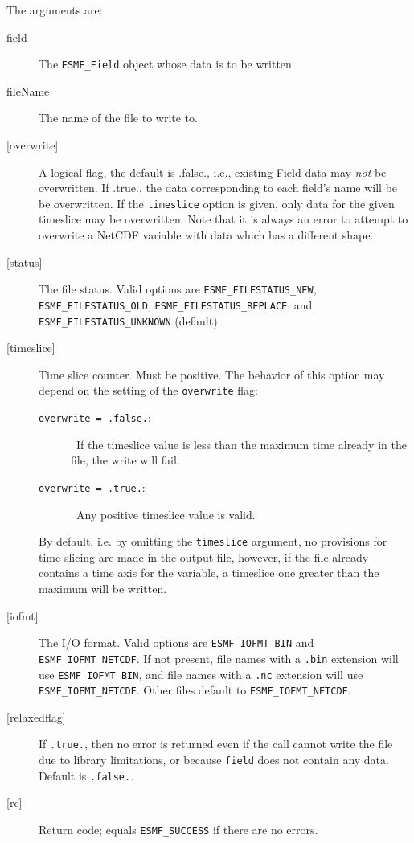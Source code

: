      The arguments are:
     \begin{description}
     \item[field]
       The {\tt ESMF\_Field} object whose data is to be written.
     \item[fileName]
       The name of the file to write to.
     \item[{[overwrite]}]
        A logical flag, the default is .false., i.e., existing Field data may
        {\em not} be overwritten. If .true., the
        data corresponding to each field's name will be
        be overwritten. If the {\tt timeslice} option is given, only data for
        the given timeslice may be overwritten.
        Note that it is always an error to attempt to overwrite a NetCDF
        variable with data which has a different shape.
     \item[{[status]}]
        The file status. Valid options are {\tt ESMF\_FILESTATUS\_NEW}, 
        {\tt ESMF\_FILESTATUS\_OLD}, {\tt ESMF\_FILESTATUS\_REPLACE}, and
        {\tt ESMF\_FILESTATUS\_UNKNOWN} (default).
     \item[{[timeslice]}]
       Time slice counter. Must be positive. The behavior of this
       option may depend on the setting of the {\tt overwrite} flag:
       \begin{description}
       \item[{\tt overwrite = .false.}:]\ If the timeslice value is
       less than the maximum time already in the file, the write will fail.
       \item[{\tt overwrite = .true.}:]\ Any positive timeslice value is valid.
       \end{description}
       By default, i.e. by omitting the {\tt timeslice} argument, no
       provisions for time slicing are made in the output file,
       however, if the file already contains a time axis for the variable,
       a timeslice one greater than the maximum will be written.
     \item[{[iofmt]}]
      The I/O format.  Valid options are  {\tt ESMF\_IOFMT\_BIN} and
      {\tt ESMF\_IOFMT\_NETCDF}. If not present, file names with a {\tt .bin} 
      extension will use {\tt ESMF\_IOFMT\_BIN}, and file names with a {\tt .nc}
      extension will use {\tt ESMF\_IOFMT\_NETCDF}.  Other files default to
      {\tt ESMF\_IOFMT\_NETCDF}.
     \item[{[relaxedflag]}]
       If {\tt .true.}, then no error is returned even if the call cannot write
       the file due to library limitations, or because {\tt field} does not 
       contain any data. Default is {\tt .false.}.
     \item[{[rc]}]
       Return code; equals {\tt ESMF\_SUCCESS} if there are no errors.
     \end{description}
   
